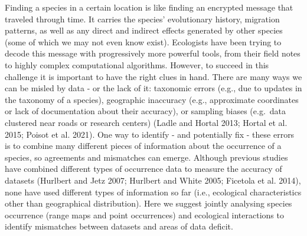 \documentclass[10pt,oneside]{article}
\begin{document}
Finding a species in a certain location is like finding an encrypted
message that traveled through time. It carries the species' evolutionary
history, migration patterns, as well as any direct and indirect effects
generated by other species (some of which we may not even know exist).
Ecologists have been trying to decode this message with progressively
more powerful tools, from their field notes to highly complex
computational algorithms. However, to succeed in this challenge it is
important to have the right clues in hand. There are many ways we can be
misled by data - or the lack of it: taxonomic errors (e.g., due to
updates in the taxonomy of a species), geographic inaccuracy (e.g.,
approximate coordinates or lack of documentation about their accuracy),
or sampling biases (e.g.~data clustered near roads or research centers)
(Ladle and Hortal 2013; Hortal et al. 2015; Poisot et al. 2021). One way
to identify - and potentially fix - these errors is to combine many
different pieces of information about the occurrence of a species, so
agreements and mismatches can emerge. Although previous studies have
combined different types of occurrence data to measure the accuracy of
datasets (Hurlbert and Jetz 2007; Hurlbert and White 2005; Ficetola et
al. 2014), none have used different types of information so far (i.e.,
ecological characteristics other than geographical distribution). Here
we suggest jointly analysing species occurrence (range maps and point
occurrences) and ecological interactions to identify mismatches between
datasets and areas of data deficit.
\end{document}
